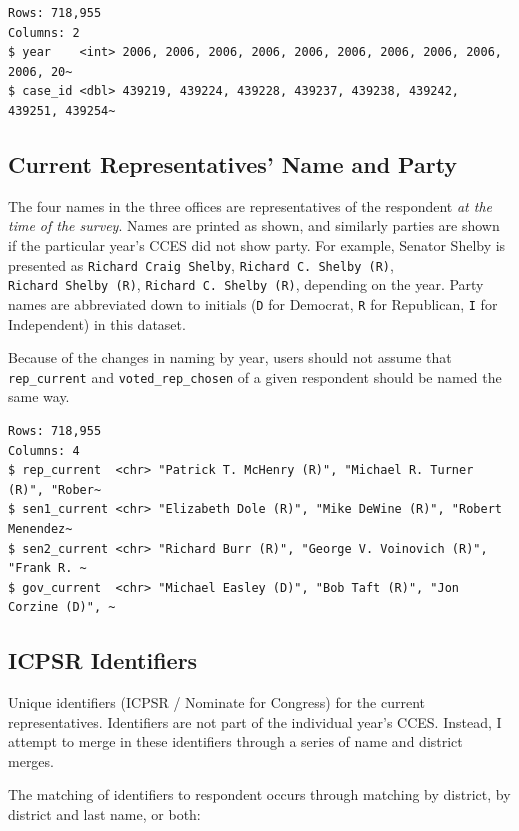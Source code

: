 \documentclass[10pt,article,oneside]{memoir}
\begin{document}
\begin{verbatim}
Rows: 718,955
Columns: 2
$ year    <int> 2006, 2006, 2006, 2006, 2006, 2006, 2006, 2006, 2006, 2006, 20~
$ case_id <dbl> 439219, 439224, 439228, 439237, 439238, 439242, 439251, 439254~
\end{verbatim}

\subsection{Current Representatives' Name and
Party}\label{current-representatives-name-and-party}

The four names in the three offices are representatives of the
respondent \emph{at the time of the survey}. Names are printed as shown,
and similarly parties are shown if the particular year's CCES did not
show party. For example, Senator Shelby is presented as
\texttt{Richard\ Craig\ Shelby}, \texttt{Richard\ C.\ Shelby\ (R)},
\texttt{Richard\ Shelby\ (R)}, \texttt{Richard\ C.\ Shelby\ (R)},
depending on the year. Party names are abbreviated down to initials
(\texttt{D} for Democrat, \texttt{R} for Republican, \texttt{I} for
Independent) in this dataset.

Because of the changes in naming by year, users should not assume that
\texttt{rep\_current} and \texttt{voted\_rep\_chosen} of a given
respondent should be named the same way.

\begin{verbatim}
Rows: 718,955
Columns: 4
$ rep_current  <chr> "Patrick T. McHenry (R)", "Michael R. Turner (R)", "Rober~
$ sen1_current <chr> "Elizabeth Dole (R)", "Mike DeWine (R)", "Robert Menendez~
$ sen2_current <chr> "Richard Burr (R)", "George V. Voinovich (R)", "Frank R. ~
$ gov_current  <chr> "Michael Easley (D)", "Bob Taft (R)", "Jon Corzine (D)", ~
\end{verbatim}

\subsection{ICPSR Identifiers}\label{icpsr-identifiers}

Unique identifiers (ICPSR / Nominate for Congress) for the current
representatives. Identifiers are not part of the individual year's CCES.
Instead, I attempt to merge in these identifiers through a series of
name and district merges.

The matching of identifiers to respondent occurs through matching by
district, by district and last name, or both:
\end{document}
